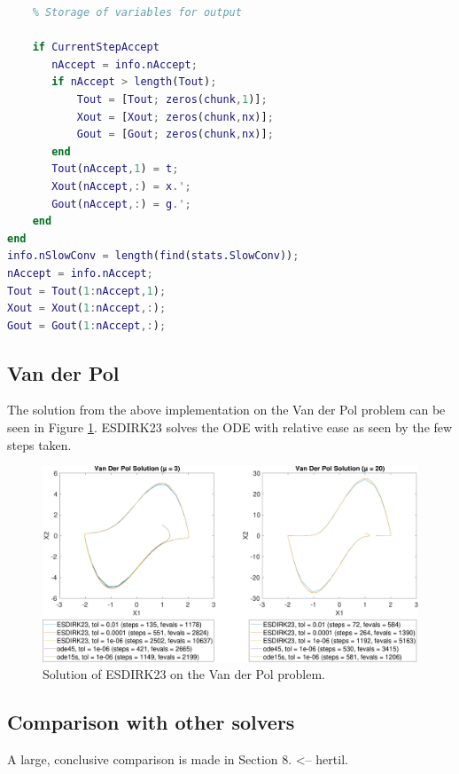 \begin{adjustwidth*}{0cm}{-0.4cm}
\begin{lstlisting}[frame=single, language=Matlab,caption=ESDIRK23, label=ESDIRK23]
    %=====================================================================
    % Storage of variables for output
    
    if CurrentStepAccept
       nAccept = info.nAccept;
       if nAccept > length(Tout);
           Tout = [Tout; zeros(chunk,1)];
           Xout = [Xout; zeros(chunk,nx)];
           Gout = [Gout; zeros(chunk,nx)];
       end
       Tout(nAccept,1) = t;
       Xout(nAccept,:) = x.';
       Gout(nAccept,:) = g.';
    end
end
info.nSlowConv = length(find(stats.SlowConv));
nAccept = info.nAccept;
Tout = Tout(1:nAccept,1);
Xout = Xout(1:nAccept,:);
Gout = Gout(1:nAccept,:);
\end{lstlisting}
\end{adjustwidth*}

\subsection{Van der Pol}
The solution from the above implementation on the Van der Pol problem can be seen in Figure \ref{fig:7_4}. ESDIRK23 solves the ODE with relative ease as seen by the few steps taken.

\begin{figure}[h]
    \centering
    \includegraphics[width=\textwidth]{plots/7_4b.pdf}
    \caption{Solution of ESDIRK23 on the Van der Pol problem.}
    \label{fig:7_4}
\end{figure}

\subsection{Comparison with other solvers}
A large, conclusive comparison is made in Section 8. <-- hertil.



